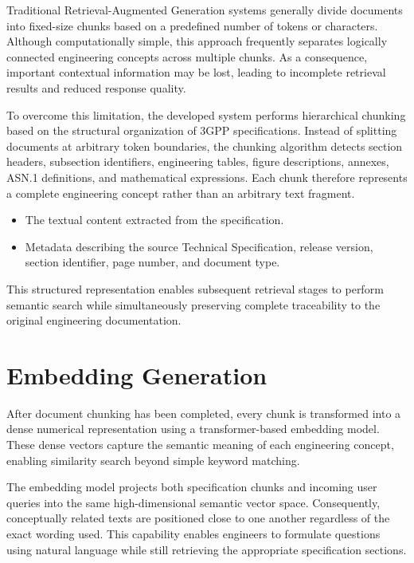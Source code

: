 Traditional Retrieval-Augmented Generation systems generally divide documents into fixed-size chunks based on a predefined number of tokens or characters. Although computationally simple, this approach frequently separates logically connected engineering concepts across multiple chunks. As a consequence, important contextual information may be lost, leading to incomplete retrieval results and reduced response quality.

To overcome this limitation, the developed system performs hierarchical chunking based on the structural organization of 3GPP specifications. Instead of splitting documents at arbitrary token boundaries, the chunking algorithm detects section headers, subsection identifiers, engineering tables, figure descriptions, annexes, ASN.1 definitions, and mathematical expressions. Each chunk therefore represents a complete engineering concept rather than an arbitrary text fragment.


\begin{itemize}
    \item The textual content extracted from the specification.
    \item Metadata describing the source Technical Specification, release version, section identifier, page number, and document type.
\end{itemize}

This structured representation enables subsequent retrieval stages to perform semantic search while simultaneously preserving complete traceability to the original engineering documentation.

\section{Embedding Generation}

After document chunking has been completed, every chunk is transformed into a dense numerical representation using a transformer-based embedding model. These dense vectors capture the semantic meaning of each engineering concept, enabling similarity search beyond simple keyword matching.

The embedding model projects both specification chunks and incoming user queries into the same high-dimensional semantic vector space. Consequently, conceptually related texts are positioned close to one another regardless of the exact wording used. This capability enables engineers to formulate questions using natural language while still retrieving the appropriate specification sections.

